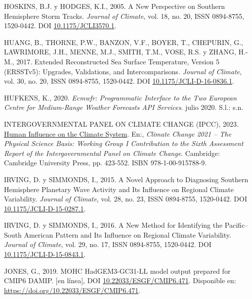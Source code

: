 \documentclass[12pt,oneside,a4paper]{reedthesis}
\newlength{\cslhangindent}
\newenvironment{CSLReferences}[2] %
 {%
  \setlength{\parindent}{0pt}
  \ifodd #1 \everypar{\setlength{\hangindent}{\cslhangindent}}\ignorespaces\fi
  \ifnum #2 > 0
  \setlength{\parskip}{#2\baselineskip}
  \fi
 }%
 {}
\begin{document}
\begin{CSLReferences}{1}{0}
\leavevmode{}%
HOSKINS, B.J. y HODGES, K.I., 2005. A {New Perspective} on {Southern Hemisphere Storm Tracks}. \emph{Journal of Climate}, vol. 18, no. 20, ISSN 0894-8755, 1520-0442. DOI \href{https://doi.org/10.1175/JCLI3570.1}{10.1175/JCLI3570.1}.

\leavevmode{}%
HUANG, B., THORNE, P.W., BANZON, V.F., BOYER, T., CHEPURIN, G., LAWRIMORE, J.H., MENNE, M.J., SMITH, T.M., VOSE, R.S. y ZHANG, H.-M., 2017. Extended {Reconstructed Sea Surface Temperature}, {Version} 5 ({ERSSTv5}): {Upgrades}, {Validations}, and {Intercomparisons}. \emph{Journal of Climate}, vol. 30, no. 20, ISSN 0894-8755, 1520-0442. DOI \href{https://doi.org/10.1175/JCLI-D-16-0836.1}{10.1175/JCLI-D-16-0836.1}.

\leavevmode{}%
HUFKENS, K., 2020. \emph{Ecmwfr: {Programmatic} Interface to the Two {European Centre} for {Medium-Range Weather Forecasts API} Services}. julio 2020. S.l.: s.n.

\leavevmode{}%
INTERGOVERNMENTAL PANEL ON CLIMATE CHANGE (IPCC), 2023. \href{https://doi.org/10.1017/9781009157896.005}{Human {Influence} on the {Climate System}}. En:, \emph{Climate {Change} 2021 -- {The Physical Science Basis}: {Working Group I Contribution} to the {Sixth Assessment Report} of the {Intergovernmental Panel} on {Climate Change}}. Cambridge: Cambridge University Press, pp. 423-552. ISBN 978-1-00-915788-9.

\leavevmode{}%
IRVING, D. y SIMMONDS, I., 2015. A {Novel Approach} to {Diagnosing Southern Hemisphere Planetary Wave Activity} and {Its Influence} on {Regional Climate Variability}. \emph{Journal of Climate}, vol. 28, no. 23, ISSN 0894-8755, 1520-0442. DOI \href{https://doi.org/10.1175/JCLI-D-15-0287.1}{10.1175/JCLI-D-15-0287.1}.

\leavevmode{}%
IRVING, D. y SIMMONDS, I., 2016. A {New Method} for {Identifying} the {Pacific}--{South American Pattern} and {Its Influence} on {Regional Climate Variability}. \emph{Journal of Climate}, vol. 29, no. 17, ISSN 0894-8755, 1520-0442. DOI \href{https://doi.org/10.1175/JCLI-D-15-0843.1}{10.1175/JCLI-D-15-0843.1}.

\leavevmode{}%
JONES, G., 2019. MOHC HadGEM3-GC31-LL model output prepared for CMIP6 DAMIP. {[}en línea{]}, DOI \href{https://doi.org/10.22033/ESGF/CMIP6.471}{10.22033/ESGF/CMIP6.471}. Disponible en: \url{https://doi.org/10.22033/ESGF/CMIP6.471}.


\end{CSLReferences}
\end{document}

